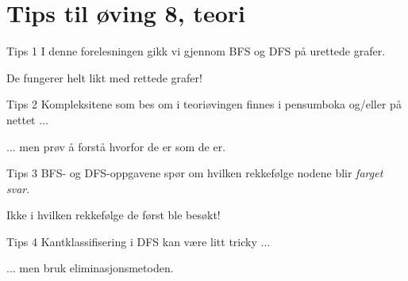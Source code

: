 \documentclass[14pt]{beamer}
\begin{document}
\section{Tips til øving 8, teori}
\begin{frame}{Tips 1}
    I denne forelesningen gikk vi gjennom BFS og DFS på urettede grafer.

    \pause

    De fungerer helt likt med rettede grafer!
\end{frame}
\begin{frame}{Tips 2}
    Kompleksitene som bes om i teoriøvingen finnes i pensumboka og/eller på nettet ...

    \pause

    ... men prøv å forstå hvorfor de er som de er.
\end{frame}
\begin{frame}{Tips 3}
    BFS- og DFS-oppgavene spør om hvilken rekkefølge nodene blir \textit{farget svar}.

    \pause

    Ikke i hvilken rekkefølge de først ble besøkt!
\end{frame}
\begin{frame}{Tips 4}
    Kantklassifisering i DFS kan være litt tricky ...

    \pause

    ... men bruk eliminasjonsmetoden.
\end{frame}
\end{document}
